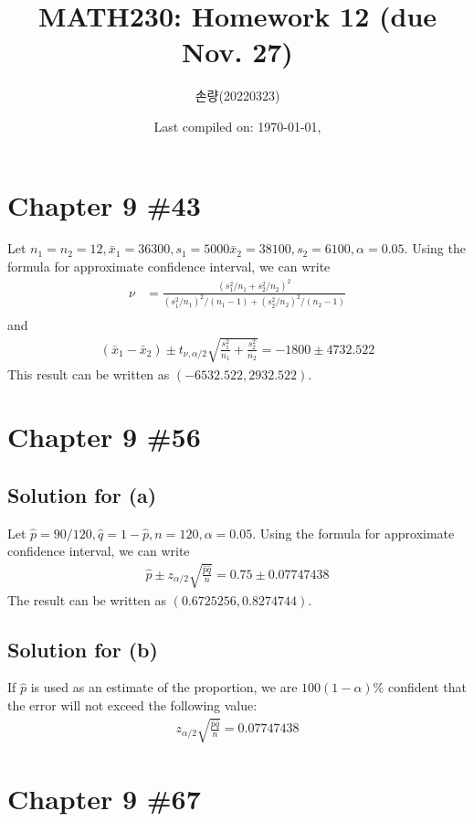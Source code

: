 \documentclass{scrartcl}
\title{MATH230: Homework 12 (due Nov. 27)}
\author{손량(20220323)}
\date{Last compiled on: \today, \currenttime}
\begin{document}
\maketitle

\section{Chapter 9 \#43}
Let \(n_1 = n_2 = 12, \bar{x}_1 = 36300, s_1 = 5000 \bar{x}_2 = 38100, s_2 =
6100, \alpha = 0.05\). Using the formula for approximate confidence interval,
we can write
\begin{align*}
  \nu
  &= \frac{(s^2_1 / n_1 + s^2_2 / n_2)^2}
    {(s^2_1 / n_1)^2 / (n_1 - 1) + (s^2_2 / n_2)^2 / (n_2 - 1)} \\
\end{align*}
and
\begin{align*}
  (\bar{x}_1 - \bar{x}_2) \pm t_{\nu, \alpha / 2}
    \sqrt{\frac{s^2_1}{n_1} + \frac{s^2_2}{n_2}}
  = -1800 \pm 4732.522
\end{align*}
This result can be written as \((-6532.522, 2932.522)\).

\section{Chapter 9 \#56}
\subsection{Solution for (a)}
Let \(\hat{p} = 90 / 120, \hat{q} = 1 - \hat{p}, n = 120, \alpha = 0.05\).
Using the formula for approximate confidence interval, we can write
\begin{align*}
  \hat{p} \pm z_{\alpha / 2} \sqrt{\frac{\hat{p} \hat{q}}{n}}
  = 0.75 \pm 0.07747438
\end{align*}
The result can be written as \((0.6725256, 0.8274744)\).

\subsection{Solution for (b)}
If \(\hat{p}\) is used as an estimate of the proportion, we are \(100(1 -
\alpha)\%\) confident that the error will not exceed the following value:
\begin{align*}
  z_{\alpha / 2} \sqrt{\frac{\hat{p} \hat{q}}{n}}
  = 0.07747438
\end{align*}

\section{Chapter 9 \#67}
\end{document}
